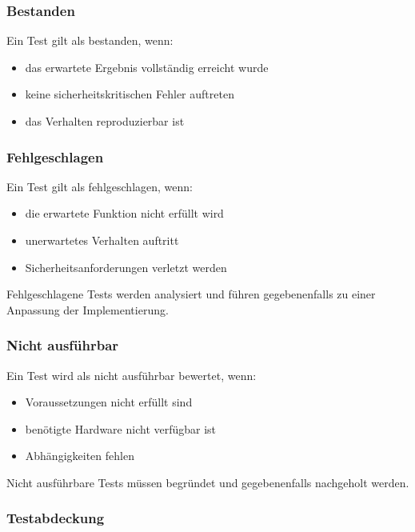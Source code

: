\subsubsection{Bestanden}\label{bestanden}

Ein Test gilt als bestanden, wenn:

\begin{itemize}
\tightlist
\item
  das erwartete Ergebnis vollständig erreicht wurde
\item
  keine sicherheitskritischen Fehler auftreten
\item
  das Verhalten reproduzierbar ist
\end{itemize}

\subsubsection{Fehlgeschlagen}\label{fehlgeschlagen}

Ein Test gilt als fehlgeschlagen, wenn:

\begin{itemize}
\tightlist
\item
  die erwartete Funktion nicht erfüllt wird
\item
  unerwartetes Verhalten auftritt
\item
  Sicherheitsanforderungen verletzt werden
\end{itemize}

Fehlgeschlagene Tests werden analysiert und führen gegebenenfalls zu
einer Anpassung der Implementierung.

\subsubsection{Nicht ausführbar}\label{nicht-ausfuxfchrbar}

Ein Test wird als nicht ausführbar bewertet, wenn:

\begin{itemize}
\tightlist
\item
  Voraussetzungen nicht erfüllt sind
\item
  benötigte Hardware nicht verfügbar ist
\item
  Abhängigkeiten fehlen
\end{itemize}

Nicht ausführbare Tests müssen begründet und gegebenenfalls nachgeholt
werden.

\subsubsection{Testabdeckung}\label{testabdeckung}

